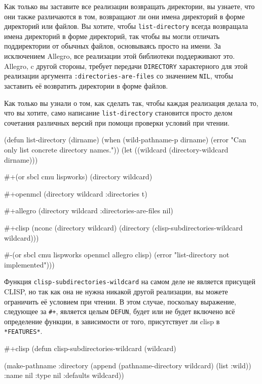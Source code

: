 Как только вы заставите все реализации возвращать директории, вы узнаете, что они также
различаются в том, возвращают ли они имена директорий в форме директорий или файлов. Вы
хотите, чтобы \lstinline{list-directory} всегда возвращала имена директорий в форме директорий,
так чтобы вы могли отличать поддиректории от обычных файлов, основываясь просто на
имени. За исключением Allegro, все реализации этой библиотеки поддерживают это.  Allegro,
c другой стороны, требует передачи \lstinline{DIRECTORY} характерного для этой реализации
аргумента \lstinline{:directories-are-files} со значением \lstinline{NIL}, чтобы заставить её
возвратить директории в форме файлов.

Как только вы узнали о том, как сделать так, чтобы каждая реализация делала то, что вы
хотите, само написание \lstinline{list-directory} становится просто делом сочетания различных
версий при помощи проверки условий при чтении.

\begin{myverb}
  (defun list-directory (dirname)
    (when (wild-pathname-p dirname)
      (error "Can only list concrete directory names."))
    (let ((wildcard (directory-wildcard dirname)))

      #+(or sbcl cmu lispworks)
      (directory wildcard)

      #+openmcl
      (directory wildcard :directories t)

      #+allegro
      (directory wildcard :directories-are-files nil)

      #+clisp
      (nconc
       (directory wildcard)
       (directory (clisp-subdirectories-wildcard wildcard)))

      #-(or sbcl cmu lispworks openmcl allegro clisp)
      (error "list-directory not implemented")))
\end{myverb}

Функция \lstinline{clisp-subdirectories-wildcard} на самом деле не является присущей CLISP, но
так как она не нужна никакой другой реализации, вы можете ограничить её условием при
чтении. В этом случае, поскольку выражение, следующее за \lstinline!#+!, является целым
\lstinline{DEFUN}, будет или не будет включено всё определение функции, в зависимости от того,
присутствует ли clisp в \lstinline{*FEATURES*}.

\begin{myverb}
  #+clisp
  (defun clisp-subdirectories-wildcard (wildcard)

    (make-pathname
     :directory (append (pathname-directory wildcard) (list :wild))
     :name nil
     :type nil
     :defaults wildcard))
\end{myverb}

